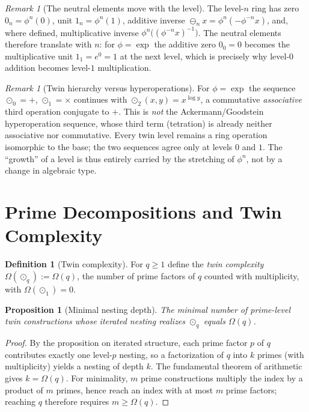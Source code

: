 \documentclass[11pt]{article}
\newtheorem{proposition}[theorem]{Proposition}
\theoremstyle{definition}
\newtheorem{definition}[theorem]{Definition}
\theoremstyle{remark}
\newtheorem{remark}[theorem]{Remark}
\begin{document}
	\begin{remark}[The neutral elements move with the level]
		The level-$n$ ring has zero $0_n=\phi^{n}(0)$, unit $1_n=\phi^{n}(1)$, additive inverse
		$\ominus_n x=\phi^{n}(-\phi^{-n}x)$, and, where defined, multiplicative inverse
		$\phi^{n}\!\bigl((\phi^{-n}x)^{-1}\bigr)$. The neutral elements therefore translate with $n$: for
		$\phi=\exp$ the additive zero $0_0=0$ becomes the multiplicative unit $1_1=e^{0}=1$ at the next
		level, which is precisely why level-$0$ addition becomes level-$1$ multiplication.
	\end{remark}

	\begin{remark}[Twin hierarchy versus hyperoperations]
		For $\phi=\exp$ the sequence $\odot_0=+$, $\odot_1=\times$ continues with
		$\odot_2(x,y)=x^{\log y}$, a commutative \emph{associative} third operation conjugate to $+$. This
		is \emph{not} the Ackermann/Goodstein hyperoperation sequence, whose third term (tetration) is
		already neither associative nor commutative. Every twin level remains a ring operation isomorphic
		to the base; the two sequences agree only at levels $0$ and $1$. The ``growth'' of a level is thus
		entirely carried by the stretching of $\phi^{n}$, not by a change in algebraic type.
	\end{remark}
	
	\section{Prime Decompositions and Twin Complexity}

	\begin{definition}[Twin complexity]
		For $q\ge 1$ define the \emph{twin complexity} $\Omega(\odot_q):=\Omega(q)$, the number of prime
		factors of $q$ counted with multiplicity, with $\Omega(\odot_1)=0$.
	\end{definition}

	\begin{proposition}[Minimal nesting depth]
		The minimal number of prime-level twin constructions whose iterated nesting realizes $\odot_q$
		equals $\Omega(q)$.
	\end{proposition}
	\begin{proof}
		By the proposition on iterated structure, each prime factor $p$ of $q$ contributes exactly one
		level-$p$ nesting, so a factorization of $q$ into $k$ primes (with multiplicity) yields a nesting of
		depth $k$. The fundamental theorem of arithmetic gives $k=\Omega(q)$. For minimality, $m$ prime
		constructions multiply the index by a product of $m$ primes, hence reach an index with at most $m$
		prime factors; reaching $q$ therefore requires $m\ge\Omega(q)$.
	\end{proof}
\end{document}
